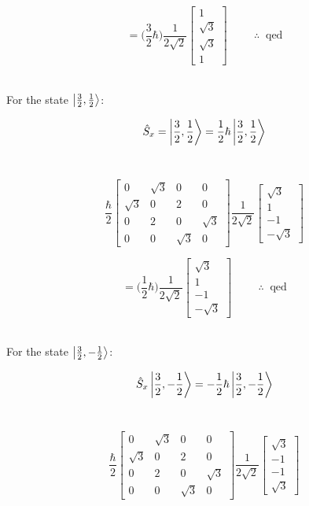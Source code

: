 \documentclass[9pt]{extarticle}
\begin{document}
\begin{multicols*}{2}
$$
= \bigg( \frac 32 \hbar \bigg) \frac{1}{2 \sqrt 2} 
\begin{bmatrix}
	1 \\
        \sqrt 3 \\
        \sqrt 3 \\
        1
\end{bmatrix}
\hspace{1cm} \therefore \;\; \text{qed}
$$ \ 

For the state $\ket{\frac 32, \frac 12}$:

$$\hat S_x = \ket{\frac 32, \frac 12} = \frac 12 \hbar \ket{\frac 32, \frac 12}$$ \ 

$$
\frac \hbar 2
\begin{bmatrix}
        0 & \sqrt 3 & 0 & 0 \\
        \sqrt 3 & 0 & 2 & 0 \\
        0 & 2 & 0 & \sqrt 3 \\
        0 & 0 & \sqrt 3 & 0 
\end{bmatrix} 
\frac{1}{2\sqrt 2}
\begin{bmatrix}
        \sqrt 3 \\
        1 \\
        -1 \\
        -\sqrt 3
\end{bmatrix}
$$

$$
= \bigg( \frac 12 \hbar \bigg) \frac{1}{2\sqrt 2}
\begin{bmatrix}
        \sqrt 3 \\
        1 \\
        -1 \\
        -\sqrt 3
\end{bmatrix}
\hspace{1cm} \therefore \;\; \text{qed}
$$ \ 

For the state $\ket{\frac 32, -\frac 12}$:

$$\hat S_x \ket{\frac 32, -\frac 12} = -\frac 12 \hbar \ket{\frac 32, -\frac 12}$$ \ 

$$
\frac \hbar 2
\begin{bmatrix}
        0 & \sqrt 3 & 0 & 0 \\
        \sqrt 3 & 0 & 2 & 0 \\
        0 & 2 & 0 & \sqrt 3 \\
        0 & 0 & \sqrt 3 & 0
\end{bmatrix} 
\frac{1}{2\sqrt 2}
\begin{bmatrix}
        \sqrt 3 \\
        -1 \\
        -1 \\
        \sqrt 3
\end{bmatrix}
$$


\end{multicols*}
\end{document}
